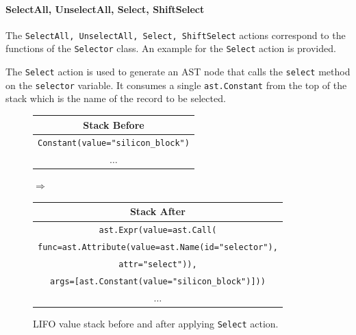 


\paragraph{SelectAll, UnselectAll, Select, ShiftSelect}
The \texttt{SelectAll, UnselectAll, Select, ShiftSelect} actions correspond to the functions of the \texttt{Selector} class. An example for the \texttt{Select} action is provided.

The \texttt{Select} action is used to generate an AST node that calls the \texttt{select} method on the \texttt{selector} variable. It consumes a single \texttt{ast.Constant} from the top of the stack which is the name of the record to be selected.

\begin{figure}[H]\label{fig:select-stack}
  \centering
  {\small
  \begin{tabular}{|c|}
    \hline
    \textbf{Stack Before} \\ \hline
    \texttt{\tiny{Constant(value="silicon\_block")}} \\ \hline
    \(\dots\) \\ \hline
  \end{tabular}
  \hspace{0.25em}$\Longrightarrow$\hspace{0.25em}
  \begin{tabular}{|c|}
    \hline
    \textbf{Stack After} \\ \hline
    \texttt{\tiny{ast.}}\texttt{Expr(value=}\texttt{\tiny{ast.}}\texttt{Call(}\\
    \texttt{func=}\texttt{\tiny{ast.}}\texttt{Attribute(value=}\texttt{\tiny{ast.}}\texttt{Name(id="selector"),}\\
    \texttt{attr="select")),}\\
    \texttt{args=[}\texttt{\tiny{ast.}}\texttt{Constant(value="silicon\_block")]))} \\ \hline
    \(\dots\) \\ \hline
  \end{tabular}
  }
  \caption{LIFO value stack before and after applying \texttt{Select} action.}
\end{figure}







